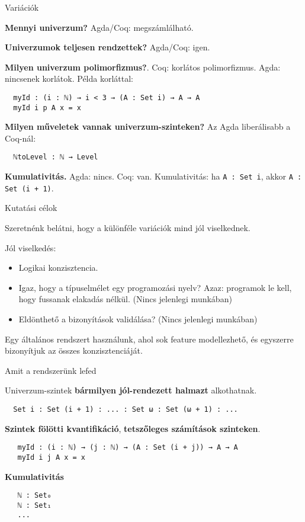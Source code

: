\documentclass[dvipsnames,10pt,aspectratio=169]{beamer}
\begin{document}
\begin{frame}[fragile]{Variációk}

\textbf{Mennyi univerzum?} Agda/Coq: megszámlálható.
\vspace{1em}

\textbf{Univerzumok teljesen rendzettek?} Agda/Coq: igen.
\vspace{1em}

\textbf{Milyen univerzum polimorfizmus?}. Coq: korlátos polimorfizmus. Agda: nincsenek
korlátok. Példa korláttal:
\begin{verbatim}
  myId : (i : ℕ) → i < 3 → (A : Set i) → A → A
  myId i p A x = x
\end{verbatim}

\textbf{Milyen műveletek vannak univerzum-szinteken?} Az Agda liberálisabb a Coq-nál:
\begin{verbatim}
  ℕtoLevel : ℕ → Level
\end{verbatim}


\textbf{Kumulativitás.} Agda: nincs. Coq: van. Kumulativitás: ha \texttt{A : Set i}, akkor \texttt{A
  : Set (i + 1)}.

\end{frame}

\begin{frame}{Kutatási célok}

Szeretnénk belátni, hogy a különféle variációk mind jól viselkednek.
\vspace{1em}

Jól viselkedés:
\begin{itemize}
  \item Logikai konzisztencia.
  \item Igaz, hogy a típuselmélet egy programozási nyelv? Azaz: programok le kell, hogy
        fussanak elakadás nélkül. (Nincs jelenlegi munkában)
  \item Eldönthető a bizonyítások validálása? (Nincs jelenlegi munkában)
\end{itemize}

Egy általános rendszert használunk, ahol sok feature modellezhető, és
egyszerre bizonyítjuk az összes konzisztenciáját.

\end{frame}


\begin{frame}[fragile]{Amit a rendszerünk lefed}

Univerzum-szintek \textbf{bármilyen jól-rendezett halmazt} alkothatnak.
\begin{verbatim}
  Set i : Set (i + 1) : ... : Set ω : Set (ω + 1) : ...
\end{verbatim}
\textbf{Szintek fölötti kvantifikáció}, \textbf{tetszőleges számítások szinteken}.
\begin{verbatim}
   myId : (i : ℕ) → (j : ℕ) → (A : Set (i + j)) → A → A
   myId i j A x = x
\end{verbatim}
\textbf{Kumulativitás}
\begin{verbatim}
   ℕ : Set₀
   ℕ : Set₁
   ...
\end{verbatim}

\end{frame}
\end{document}
